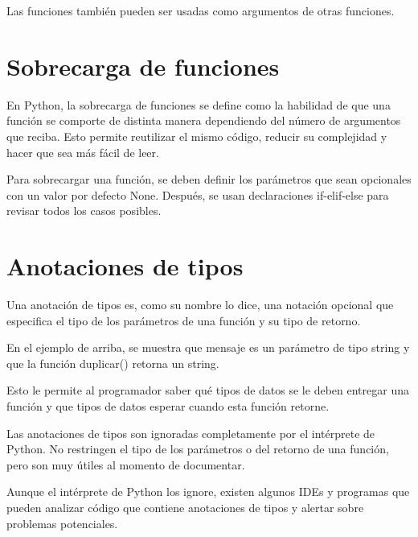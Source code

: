 \documentclass{report}
\begin{document}

Las funciones también pueden ser usadas como argumentos de otras funciones.


\section{Sobrecarga de funciones}

En Python, la sobrecarga de funciones se define como la habilidad de que una función se comporte de distinta manera dependiendo del número de argumentos que reciba. Esto permite reutilizar el mismo código, reducir su complejidad y hacer que sea más fácil de leer.

Para sobrecargar una función, se deben definir los parámetros que sean opcionales con un valor por defecto None. Después, se usan declaraciones if-elif-else para revisar todos los casos posibles.



\section{Anotaciones de tipos}

Una anotación de tipos es, como su nombre lo dice, una notación opcional que especifica el tipo de los parámetros de una función y su tipo de retorno.


En el ejemplo de arriba, se muestra que mensaje es un parámetro de tipo string y que la función duplicar() retorna un string.

Esto le permite al programador saber qué tipos de datos se le deben entregar una función y que tipos de datos esperar cuando esta función retorne.

Las anotaciones de tipos son ignoradas completamente por el intérprete de Python. No restringen el tipo de los parámetros o del retorno de una función, pero son muy útiles al momento de documentar.


Aunque el intérprete de Python los ignore, existen algunos IDEs y programas que pueden analizar código que contiene anotaciones de tipos y alertar sobre problemas potenciales.
\end{document}
